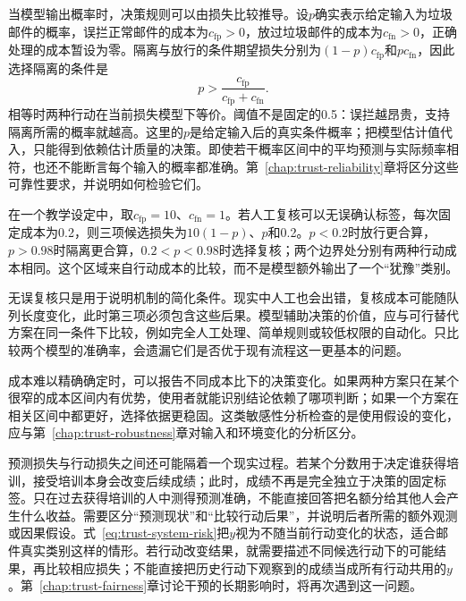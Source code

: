 当模型输出概率时，决策规则可以由损失比较推导。设$p$确实表示给定输入为垃圾邮件的概率，误拦正常邮件的成本为$c_{\mathrm{fp}}>0$，放过垃圾邮件的成本为$c_{\mathrm{fn}}>0$，正确处理的成本暂设为零。隔离与放行的条件期望损失分别为$(1-p)c_{\mathrm{fp}}$和$pc_{\mathrm{fn}}$，因此选择隔离的条件是
\begin{equation}
 p>\frac{c_{\mathrm{fp}}}{c_{\mathrm{fp}}+c_{\mathrm{fn}}}.
 \label{eq:trust-cost-threshold}
\end{equation}
相等时两种行动在当前损失模型下等价。阈值不是固定的0.5：误拦越昂贵，支持隔离所需的概率就越高。这里的$p$是给定输入后的真实条件概率；把模型估计值代入，只能得到依赖估计质量的决策。即使若干概率区间中的平均预测与实际频率相符，也还不能断言每个输入的概率都准确。第~\ref{chap:trust-reliability}章将区分这些可靠性要求，并说明如何检验它们。

\begin{example}[增加复核选项后的决策]
\label{ex:trust-review-cost}
在一个教学设定中，取$c_{\mathrm{fp}}=10$、$c_{\mathrm{fn}}=1$。若人工复核可以无误确认标签，每次固定成本为0.2，则三项候选损失为$10(1-p)$、$p$和0.2。$p<0.2$时放行更合算，$p>0.98$时隔离更合算，$0.2<p<0.98$时选择复核；两个边界处分别有两种行动成本相同。这个区域来自行动成本的比较，而不是模型额外输出了一个“犹豫”类别。
\end{example}

无误复核只是用于说明机制的简化条件。现实中人工也会出错，复核成本可能随队列长度变化，此时第三项必须包含这些后果。模型辅助决策的价值，应与可行替代方案在同一条件下比较，例如完全人工处理、简单规则或较低权限的自动化。只比较两个模型的准确率，会遗漏它们是否优于现有流程这一更基本的问题。

成本难以精确确定时，可以报告不同成本比下的决策变化。如果两种方案只在某个很窄的成本区间内有优势，使用者就能识别结论依赖了哪项判断；如果一个方案在相关区间中都更好，选择依据更稳固。这类敏感性分析检查的是使用假设的变化，应与第~\ref{chap:trust-robustness}章对输入和环境变化的分析区分。

预测损失与行动损失之间还可能隔着一个现实过程。若某个分数用于决定谁获得培训，接受培训本身会改变后续成绩；此时，成绩不再是完全独立于决策的固定标签。只在过去获得培训的人中测得预测准确，不能直接回答把名额分给其他人会产生什么收益。需要区分“预测现状”和“比较行动后果”，并说明后者所需的额外观测或因果假设。式~\eqref{eq:trust-system-risk}把$y$视为不随当前行动变化的状态，适合邮件真实类别这样的情形。若行动改变结果，就需要描述不同候选行动下的可能结果，再比较相应损失；不能直接把历史行动下观察到的成绩当成所有行动共用的$y$。第~\ref{chap:trust-fairness}章讨论干预的长期影响时，将再次遇到这一问题。

